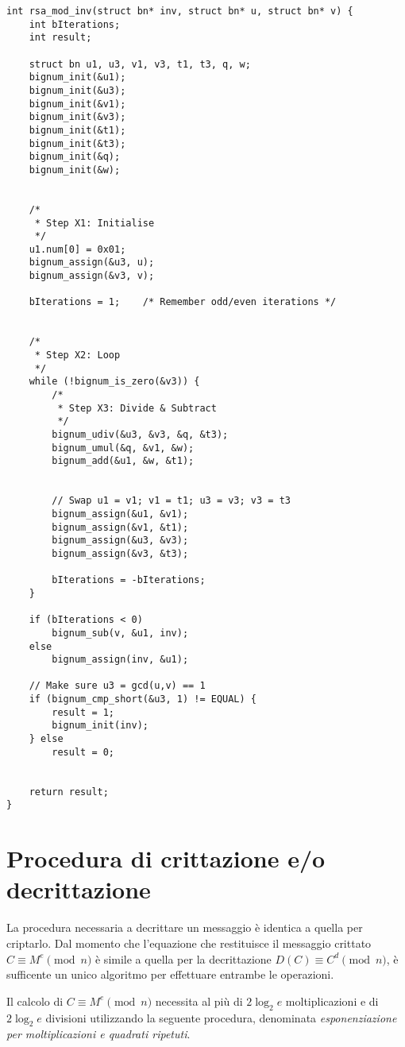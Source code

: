 \begin{lstlisting}[basicstyle=\ttfamily\small, backgroundcolor=\color{bgCode}]
int rsa_mod_inv(struct bn* inv, struct bn* u, struct bn* v) {	
    int bIterations;
    int result;
    
    struct bn u1, u3, v1, v3, t1, t3, q, w;
    bignum_init(&u1);
    bignum_init(&u3);
    bignum_init(&v1);
    bignum_init(&v3);
    bignum_init(&t1);
    bignum_init(&t3);
    bignum_init(&q);
    bignum_init(&w);
    
    
    /*
     * Step X1: Initialise
     */
    u1.num[0] = 0x01;
    bignum_assign(&u3, u);
    bignum_assign(&v3, v);

    bIterations = 1;	/* Remember odd/even iterations */
    
    
    /*
     * Step X2: Loop
     */
    while (!bignum_is_zero(&v3)) {
        /*
         * Step X3: Divide & Subtract
         */
        bignum_udiv(&u3, &v3, &q, &t3);
        bignum_umul(&q, &v1, &w);
        bignum_add(&u1, &w, &t1);
        
        
        // Swap u1 = v1; v1 = t1; u3 = v3; v3 = t3
        bignum_assign(&u1, &v1);
        bignum_assign(&v1, &t1);
        bignum_assign(&u3, &v3);
        bignum_assign(&v3, &t3);
        
        bIterations = -bIterations;
    }
    
    if (bIterations < 0)
        bignum_sub(v, &u1, inv);
    else
        bignum_assign(inv, &u1);
    
    // Make sure u3 = gcd(u,v) == 1
    if (bignum_cmp_short(&u3, 1) != EQUAL) {
        result = 1;
        bignum_init(inv);
    } else
        result = 0;


    return result;
}
\end{lstlisting}
\clearpage

%
%
\section{Procedura di crittazione e/o decrittazione}
%
%

La procedura necessaria a decrittare un messaggio è identica a quella per criptarlo. Dal momento che l'equazione che restituisce il messaggio crittato $C \equiv M^e \pmod{n}$ è simile a quella per la decrittazione $D(C) \equiv C^d \pmod{n}$, è sufficente un unico algoritmo per effettuare entrambe le operazioni.

Il calcolo di $C \equiv M^e \pmod{n}$ necessita al più di $2\log_2 e$ moltiplicazioni e di $2\log_2 e$ divisioni utilizzando la seguente procedura, denominata \emph{esponenziazione per moltiplicazioni e quadrati ripetuti}.

